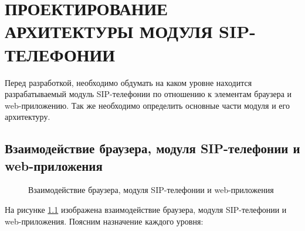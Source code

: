 \chapter{ПРОЕКТИРОВАНИЕ АРХИТЕКТУРЫ МОДУЛЯ SIP-ТЕЛЕФОНИИ}

Перед разработкой, необходимо обдумать на каком уровне находится разрабатываемый модуль SIP-телефонии по отношению к элементам браузера и web-приложению. Так же необходимо определить основные части модуля и его архитектуру.

\section{Взаимодействие браузера, модуля SIP-телефонии и web-приложения}

\begin{figure}[h!]
\caption{Взаимодействие браузера, модуля SIP-телефонии и web-приложения}
\label{image:modulesStructure}
\end{figure}

На рисунке \ref{image:modulesStructure} изображена взаимодействие браузера, модуля SIP-телефонии и web-приложения. Поясним назначение каждого уровня:

